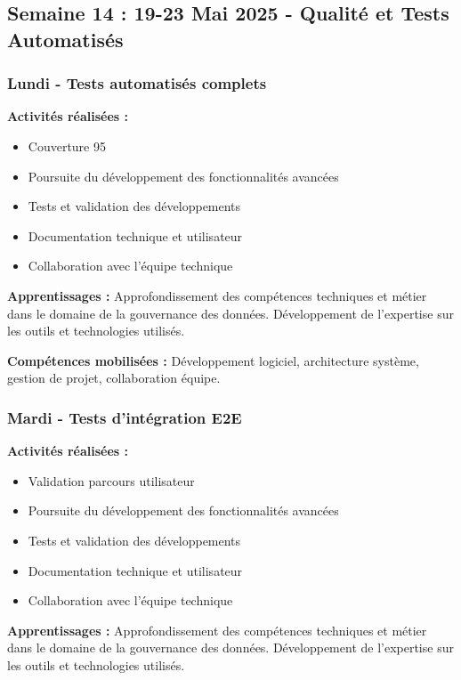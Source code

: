 \subsection{Semaine 14 : 19-23 Mai 2025 - Qualité et Tests Automatisés}

\subsubsection{Lundi - Tests automatisés complets}

\textbf{Activités réalisées :}
\begin{itemize}
    \item Couverture 95%
    \item Poursuite du développement des fonctionnalités avancées
    \item Tests et validation des développements
    \item Documentation technique et utilisateur
    \item Collaboration avec l'équipe technique
\end{itemize}

\textbf{Apprentissages :}
Approfondissement des compétences techniques et métier dans le domaine de la gouvernance des données. Développement de l'expertise sur les outils et technologies utilisés.

\textbf{Compétences mobilisées :}
Développement logiciel, architecture système, gestion de projet, collaboration équipe.

\subsubsection{Mardi - Tests d'intégration E2E}

\textbf{Activités réalisées :}
\begin{itemize}
    \item Validation parcours utilisateur
    \item Poursuite du développement des fonctionnalités avancées
    \item Tests et validation des développements
    \item Documentation technique et utilisateur
    \item Collaboration avec l'équipe technique
\end{itemize}

\textbf{Apprentissages :}
Approfondissement des compétences techniques et métier dans le domaine de la gouvernance des données. Développement de l'expertise sur les outils et technologies utilisés.

